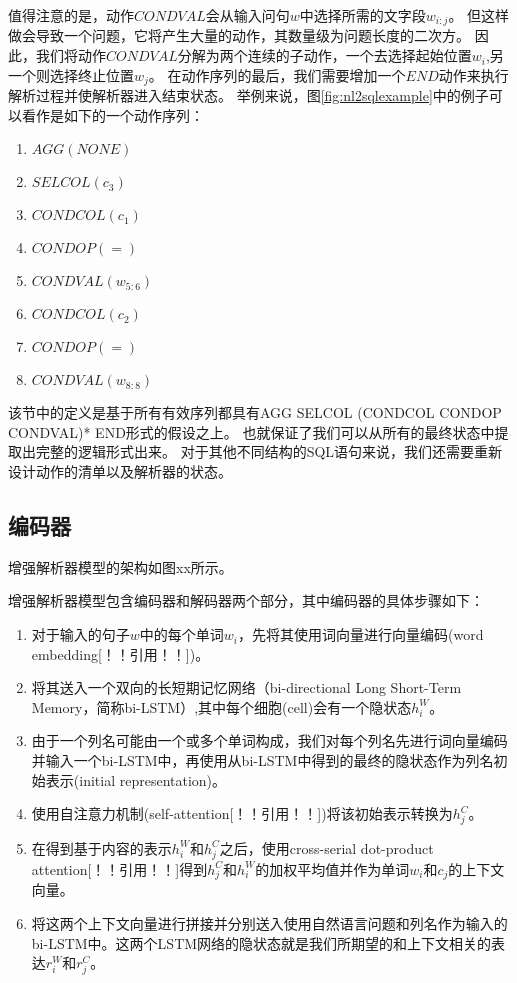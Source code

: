 值得注意的是，动作$CONDVAL$会从输入问句$w$中选择所需的文字段$w_{i:j}$。
但这样做会导致一个问题，它将产生大量的动作，其数量级为问题长度的二次方。
因此，我们将动作$CONDVAL$分解为两个连续的子动作，一个去选择起始位置$w_i$,另一个则选择终止位置$w_j$。
在动作序列的最后，我们需要增加一个$END$动作来执行解析过程并使解析器进入结束状态。
举例来说，图\ref{fig:nl2sqlexample}中的例子可以看作是如下的一个动作序列：
\begin{enumerate}
  \item $AGG(NONE)$
  \item $SELCOL(c_3)$
  \item $CONDCOL(c_1)$
  \item $CONDOP(=)$
  \item $CONDVAL(w_{5:6})$
  \item $CONDCOL(c_2)$
  \item $CONDOP(=)$
  \item $CONDVAL(w_{8:8})$
\end{enumerate}

该节中的定义是基于所有有效序列都具有AGG  SELCOL  (CONDCOL  CONDOP  CONDVAL)* END形式的假设之上。
也就保证了我们可以从所有的最终状态中提取出完整的逻辑形式出来。
对于其他不同结构的SQL语句来说，我们还需要重新设计动作的清单以及解析器的状态。


\subsection{编码器}
\label{enl2sql:encoder}

增强解析器模型的架构如图xx所示。

增强解析器模型包含编码器和解码器两个部分，其中编码器的具体步骤如下：
\begin{enumerate}
  \item 对于输入的句子$w$中的每个单词$w_i$，先将其使用词向量进行向量编码(word embedding[！！引用！！])。
  \item 将其送入一个双向的长短期记忆网络（bi-directional Long Short-Term Memory，简称bi-LSTM）,其中每个细胞(cell)会有一个隐状态$h^W_i$。
  \item 由于一个列名可能由一个或多个单词构成，我们对每个列名先进行词向量编码并输入一个bi-LSTM中，再使用从bi-LSTM中得到的最终的隐状态作为列名初始表示(initial representation)。
  \item 使用自注意力机制(self-attention[！！引用！！])将该初始表示转换为$h^C_j$。
  \item 在得到基于内容的表示$h^W_i$和$h^C_j$之后，使用cross-serial dot-product attention[！！引用！！]得到$h^C_j$和$h^W_i$的加权平均值并作为单词$w_i$和$c_j$的上下文向量。
  \item 将这两个上下文向量进行拼接并分别送入使用自然语言问题和列名作为输入的bi-LSTM中。这两个LSTM网络的隐状态就是我们所期望的和上下文相关的表达$r^W_i$和$r^C_j$。
\end{enumerate}


